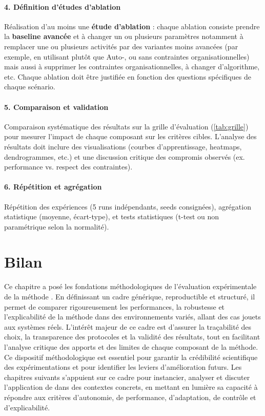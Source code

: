 \paragraph{4. Définition d'études d'ablation}
Réalisation d'au moins une \textbf{étude d'ablation} : chaque ablation consiste prendre la \textbf{baseline avancée} et à changer un ou plusieurs paramètres notamment à remplacer une ou plusieurs activités  par des variantes moins avancées (par exemple,  en utilisant  plutôt que Auto-, ou  sans contraintes organisationnelles) mais aussi à supprimer les contraintes organisationnelles, à changer d'algorithme, etc. Chaque ablation doit être justifiée en fonction des questions spécifiques de chaque scénario.

\paragraph{5. Comparaison et validation}
Comparaison systématique des résultats sur la grille d'évaluation (\autoref{tab:grille}) pour mesurer l'impact de chaque composant sur les critères cibles. L'analyse des résultats doit inclure des visualisations (courbes d'apprentissage, heatmaps, dendrogrammes, etc.) et une discussion critique des compromis observés (ex. performance vs. respect des contraintes).

\paragraph{6. Répétition et agrégation}
Répétition des expériences (5 runs indépendants, seeds consignées), agrégation statistique (moyenne, écart-type), et tests statistiques (t-test ou non paramétrique selon la normalité).


\section{Bilan}

Ce chapitre a posé les fondations méthodologiques de l'évaluation expérimentale de la méthode . En définissant un cadre générique, reproductible et structuré, il permet de comparer rigoureusement les performances, la robustesse et l'explicabilité de la méthode dans des environnements variés, allant des cas jouets aux systèmes réels. L'intérêt majeur de ce cadre est d'assurer la traçabilité des choix, la transparence des protocoles et la validité des résultats, tout en facilitant l'analyse critique des apports et des limites de chaque composant de la méthode. Ce dispositif méthodologique est essentiel pour garantir la crédibilité scientifique des expérimentations et pour identifier les leviers d'amélioration futurs. Les chapitres suivants s'appuient sur ce cadre pour instancier, analyser et discuter l'application de  dans des contextes concrets, en mettant en lumière sa capacité à répondre aux critères d'autonomie, de performance, d'adaptation, de contrôle et d'explicabilité.


